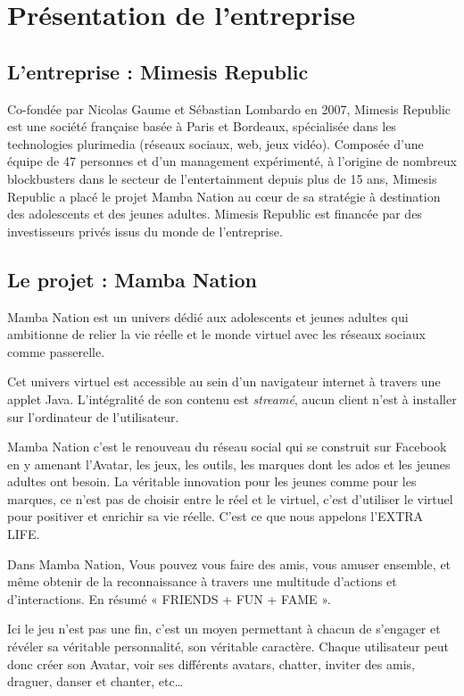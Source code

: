 \chapter{Présentation de l'entreprise}

\section{L'entreprise : Mimesis Republic}

Co-fondée par Nicolas Gaume et Sébastian Lombardo en 2007, Mimesis Republic est
une société française basée à Paris et Bordeaux, spécialisée dans les
technologies plurimedia (réseaux sociaux, web, jeux vidéo). Composée d’une
équipe de 47 personnes et d’un management expérimenté, à l’origine de nombreux
blockbusters dans le secteur de l’entertainment depuis plus de 15 ans, Mimesis
Republic a placé le projet Mamba Nation au cœur de sa stratégie à destination
des adolescents et des jeunes adultes. Mimesis Republic est financée par des
investisseurs privés issus du monde de l’entreprise.

\section{Le projet : Mamba Nation}

Mamba Nation est un univers dédié aux adolescents et jeunes adultes qui
ambitionne de relier la vie réelle et le monde virtuel avec les réseaux sociaux
comme passerelle.

Cet univers virtuel est accessible au sein d'un navigateur internet à travers
une applet Java. L'intégralité de son contenu est \textit{streamé}, aucun client n'est à
installer sur l'ordinateur de l'utilisateur.

Mamba Nation c’est le renouveau du réseau social qui se construit sur Facebook
en y amenant l’Avatar, les jeux, les outils, les marques dont les ados et les
jeunes adultes ont besoin.
La véritable innovation pour les jeunes comme pour les marques, ce n’est pas de
choisir entre le réel et le virtuel, c’est d’utiliser le virtuel pour positiver
et enrichir sa vie réelle. C’est ce que nous appelons l’EXTRA LIFE.

Dans Mamba Nation, Vous pouvez vous faire des amis, vous amuser ensemble, et
même obtenir de la reconnaissance à travers une multitude d’actions et
d’interactions. En résumé «  FRIENDS + FUN + FAME ».

Ici le jeu n’est pas une fin, c’est un moyen permettant à chacun de s’engager et
révéler sa véritable personnalité, son véritable caractère.
Chaque utilisateur peut donc créer son Avatar, voir ses différents avatars,
chatter, inviter des amis, draguer, danser et chanter, etc…

